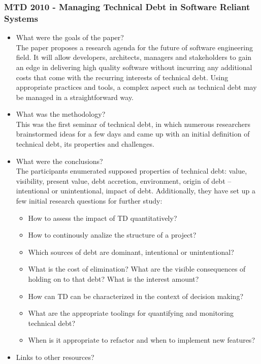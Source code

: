\documentclass{mprop}
\begin{document}
\subsubsection{MTD 2010 - Managing Technical Debt in Software Reliant Systems} \cite{Brown2010}
\begin{itemize}
	\item What were the goals of the paper? \\
	      The paper proposes a research agenda for the future of software engineering field.
	      It will allow developers, architects, managers and stakeholders to gain an edge in delivering high quality software without incurring any additional costs that come with the recurring interests of technical debt.
	      Using appropriate practices and tools, a complex aspect such as technical debt may be managed in a straightforward way.
	\item What was the methodology? \\
	      This was the first seminar of technical debt, in which numerous researchers brainstormed ideas for a few days and came up with an initial definition of technical debt, its properties and challenges.
	\item What were the conclusions? \\
	      The participants enumerated supposed properties of technical debt: value, visibility, present value, debt accretion, environment, origin of debt – intentional or unintentional, impact of debt.
	      Additionally, they have set up a few initial research questions for further study:
	      \begin{itemize}
		      \item How to assess the impact of TD quantitatively?
		      \item How to continously analize the structure of a project?
		      \item Which sources of debt are dominant, intentional or unintentional?
		      \item What is the cost of elimination? What are the visible consequences of holding on to that debt? What is the interest amount?
		      \item How can TD can be characterized in the context of decision making?
		      \item What are the appropriate toolings for quantifying and monitoring technical debt?
		      \item When is it appropriate to refactor and when to implement new features?
	      \end{itemize}
	\item Links to other resources?
\end{itemize}
\end{document}
